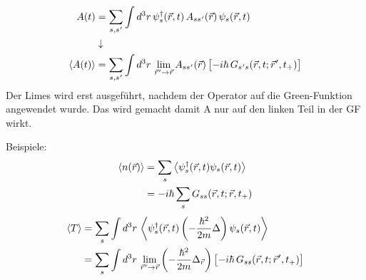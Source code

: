 \begin{equation}
  \begin{aligned}
    A(t)       & =\sum_{s,s\mkern1mu'}\int d^3r\,\psi^{\dagger}_{s}(\vec{r},t)\,A_{ss\mkern1mu'}(\vec{r})\,\psi_{s}(\vec{r},t)                                                          \\
               & \downarrow                                                                                                                                                             \\
    \left\langle A(t)\right\rangle & =\sum_{s,s\mkern1mu'}\int d^3r\,\lim_{\vec{r}\mkern1mu'\to \vec{r}}A_{ss\mkern1mu'}(\vec{r})\,\bigl[-i\hbar\,G_{s\mkern1mu's}(\vec{r},t;\vec{r}\mkern1mu',t_{+})\bigr]
  \end{aligned}
\end{equation}
Der Limes wird erst ausgeführt, nachdem der Operator auf die Green-Funktion angewendet wurde. Das wird gemacht damit A nur auf den linken Teil in der GF wirkt.

Beispiele:
\begin{equation*}
  \begin{aligned}
    \left\langle n(\vec{r})\right\rangle
     & = \sum_s\left\langle\psi^{\dagger}_s(\vec{r},t)\psi_s(\vec{r},t)\right\rangle \\
     & = -i\hbar\sum_s G_{ss}(\vec{r},t;\vec{r},t_{+})
  \end{aligned}
\end{equation*}
\begin{equation*}
  \begin{aligned}
    \left\langle T\right\rangle
     & = \sum_s\int d^3r\,\left\langle\psi^{\dagger}_s(\vec{r},t)\left(-\frac{\hbar^2}{2m}\Delta\right)\psi_s(\vec{r},t)\right\rangle                                                          \\
     & = \sum_s\int d^3r\,\lim_{\vec{r}\mkern1mu'\to \vec{r}}\left(-\frac{\hbar^2}{2m}\Delta_{\vec{r}}\right)\bigl[-i\hbar\,G_{ss}(\vec{r},t;\vec{r}\mkern1mu',t_{+})\bigr]
  \end{aligned}
\end{equation*}


